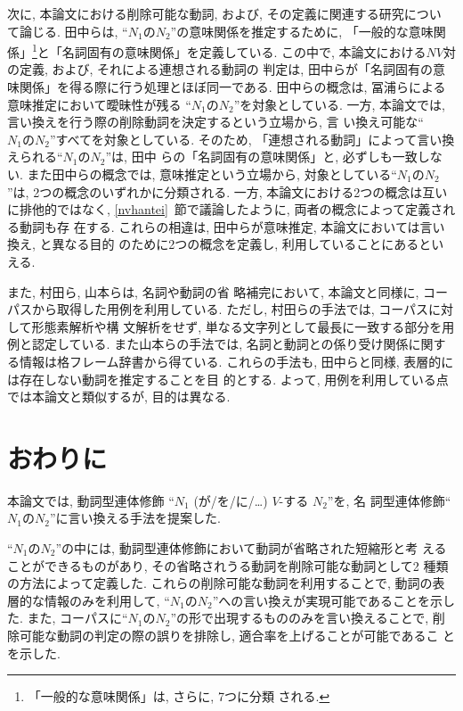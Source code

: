 次に, 本論文における削除可能な動詞, および, その定義に関連する研究につい
て論じる.
田中ら\cite{tanaka98b}は, 
``$N_1$の$N_2$''の意味関係を推定するために,
「一般的な意味関係」\footnote{「一般的な意味関係」は, さらに, 7つに分類
される.}と「名詞固有の意味関係」を定義している.
この中で, 本論文における$NV対$の定義, および, それによる連想される動詞の
判定は, 田中らが「名詞固有の意味関係」を得る際に行う処理とほぼ同一である.
田中らの概念は, 冨浦ら\cite{tomiura95}による意味推定において曖昧性が残る
``$N_1のN_2$''を対象としている.
一方, 本論文では, 言い換えを行う際の削除動詞を決定するという立場から, 言
い換え可能な``$N_1のN_2$''すべてを対象としている.
そのため, 「連想される動詞」によって言い換えられる``$N_1のN_2$''は, 田中
らの「名詞固有の意味関係」と, 必ずしも一致しない.
また田中らの概念では, 意味推定という立場から, 対象としている``$N_1の
N_2$''は, 2つの概念のいずれかに分類される.
一方, 本論文における2つの概念は互いに排他的ではなく, 
\ref{nvhantei}~節で議論したように, 両者の概念によって定義される動詞も存
在する.
これらの相違は, 田中らが意味推定, 本論文においては言い換え, と異なる目的
のために2つの概念を定義し, 利用していることにあるといえる.

また, 村田ら\cite{murata98a}, 山本ら\cite{yamamoto98}は, 名詞や動詞の省
略補完において, 本論文と同様に, コーパスから取得した用例を利用している.
ただし, 村田らの手法\cite{murata98a}では, コーパスに対して形態素解析や構
文解析をせず, 単なる文字列として最長に一致する部分を用例と認定している.
また山本らの手法\cite{yamamoto98}では, 
名詞と動詞との係り受け関係に関する情報は格フレーム辞書から得ている.
これらの手法も, 田中らと同様, 表層的には存在しない動詞を推定することを目
的とする.
よって, 用例を利用している点では本論文と類似するが, 目的は異なる.

\section{おわりに}
本論文では, 動詞型連体修飾 ``$N_1$ (が/を/に/…) $V$-する $N_2$''を, 名
詞型連体修飾``$N_1$の$N_2$''に言い換える手法を提案した. 

``$N_1のN_2$''の中には, 動詞型連体修飾において動詞が省略された短縮形と考
えることができるものがあり, その省略されうる動詞を削除可能な動詞として2
種類の方法によって定義した. 
これらの削除可能な動詞を利用することで, 動詞の表層的な情報のみを利用して, 
``$N_1のN_2$''への言い換えが実現可能であることを示した.
また, コーパスに``$N_1$の$N_2$''の形で出現するもののみを言い換えることで,
削除可能な動詞の判定の際の誤りを排除し, 適合率を上げることが可能であるこ
とを示した.

